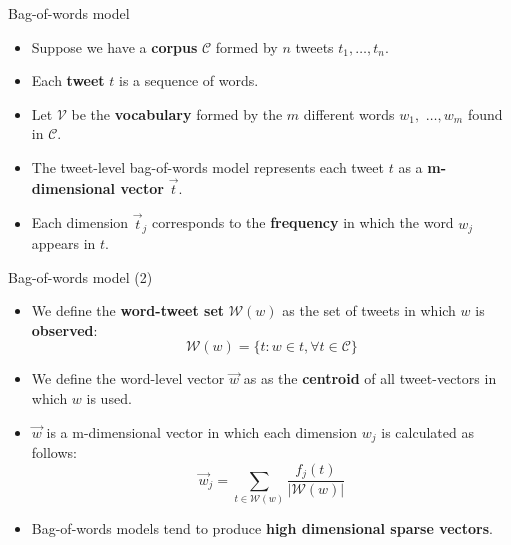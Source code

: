 \documentclass[handout]{beamer}
\begin{document}
\begin{frame}{Bag-of-words model}
\begin{scriptsize}
\begin{itemize}
\item Suppose we have a \textbf{corpus} $\mathcal{C}$ formed by $n$ tweets $t_1,\dots,t_n$.
\item  Each \textbf{tweet} \textbf{$t$} is a sequence of words.
\item  Let $\mathcal{V}$ be the \textbf{vocabulary} formed by the $m$ different words $w_1,$ $\dots, w_m$ found in $\mathcal{C}$.
\item  The tweet-level bag-of-words model represents each tweet $t$ as a \textbf{m-dimensional vector} $\overrightarrow{t}$.
\item Each dimension $\overrightarrow{t}_j$ corresponds to the \textbf{frequency} in which the word $w_j$ appears in $t$.   


\end{itemize}
\end{scriptsize}
\end{frame}



\begin{frame}{Bag-of-words model (2)}
\begin{scriptsize}
\begin{itemize}

\item We define the \textbf{word-tweet set} $\mathcal{W}(w)$ as the set of tweets in which $w$ is \textbf{observed}:
\begin{equation}
\mathcal{W}(w)=\{ t: w \in t, \forall t \in \mathcal{C}\}
\end{equation}

\item We define the word-level vector $\overrightarrow{w}$ as as the \textbf{centroid} of all tweet-vectors in which $w$ is used. 

\item $\overrightarrow{w}$ is a m-dimensional vector in which each dimension $w_j$ is calculated as follows:
\begin{equation}
\overrightarrow{w}_j = \sum_{t \in \mathcal{W}(w)} \frac{f_j(t)}{|\mathcal{W}(w)|}
\end{equation}

\item Bag-of-words models tend to produce \textbf{high dimensional sparse vectors}.

\end{itemize}
\end{scriptsize}
\end{frame}
\end{document}
